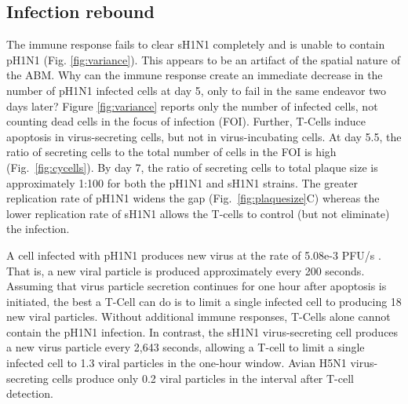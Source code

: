 \documentclass[10pt]{article}
\begin{document}
\subsection*{Infection rebound}

The immune response fails to clear sH1N1 completely and is unable to contain pH1N1 (Fig. \ref{fig:variance}).  This appears to be an artifact of the spatial nature of the ABM.  Why can the immune response create an immediate decrease in the number of pH1N1 infected cells at day 5, only to fail in the same endeavor two days later?   Figure \ref{fig:variance} reports only the number of infected cells, not counting dead cells in the focus of infection (FOI).  Further, T-Cells induce apoptosis in virus-secreting cells, but not in virus-incubating cells.  At day 5.5, the ratio of secreting cells to the total number of cells in the FOI is high (Fig.~\ref{fig:cycells}). By day 7, the ratio of secreting cells to total plaque size is approximately 1:100 for both the pH1N1 and sH1N1 strains.  The greater replication rate of pH1N1 widens the gap (Fig.~\ref{fig:plaquesize}C) whereas the lower replication rate of sH1N1 allows the T-cells to control (but not eliminate) the infection.

A cell infected with pH1N1 produces new virus at the rate of 5.08e-3 PFU/s \cite{Mitchell2011}.  That is, a new viral particle is produced approximately every 200 seconds.  Assuming that virus particle secretion continues for one hour after apoptosis is initiated, the best a T-Cell can do is to limit a single infected cell to producing 18 new viral particles.  Without additional immune responses, T-Cells alone cannot contain the pH1N1 infection.  In contrast, the sH1N1 virus-secreting cell produces a new virus particle every 2,643 seconds, allowing a T-cell to limit a single infected cell to 1.3 viral particles in the one-hour window.  Avian H5N1 virus-secreting cells produce only 0.2 viral particles in the interval after T-cell detection. 
\end{document}
